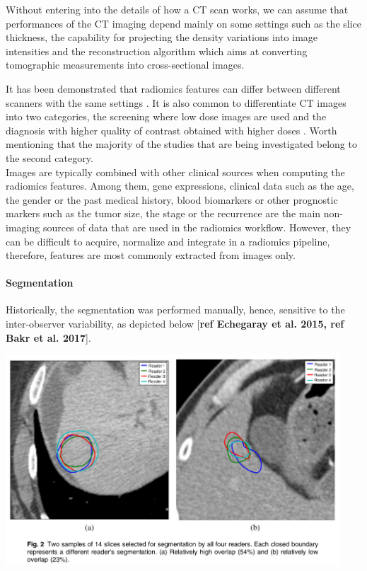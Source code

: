 \documentclass[]{article}
\let\oldparagraph\paragraph
\renewcommand{\paragraph}[1]{\oldparagraph{#1}\mbox{}}
\begin{document}
Without entering into the details of how a CT scan works, we can assume
that performances of the CT imaging depend mainly on some settings such
as the slice thickness, the capability for projecting the density
variations into image intensities and the reconstruction algorithm which
aims at converting tomographic measurements into cross-sectional images.

It has been demonstrated that radiomics features can differ between
different scanners with the same settings \cite{Berenguer2018}. It is also common to differentiate CT images into two
categories, the screening where low dose images are used and the
diagnosis with higher quality of contrast obtained with higher doses \cite{Thawani2018}. Worth mentioning that the
majority of the studies that are being investigated belong to the second
category.\\
Images are typically combined with other clinical sources when computing
the radiomics features. Among them, gene expressions, clinical data such
as the age, the gender or the past medical history, blood biomarkers or
other prognostic markers such as the tumor size, the stage or the
recurrence are the main non-imaging sources of data that are used in the
radiomics workflow. However, they can be difficult to acquire, normalize
and integrate in a radiomics pipeline, therefore, features are most
commonly extracted from images only.

\paragraph{Segmentation}\label{segmentation}

Historically, the segmentation was performed manually, hence, sensitive
to the inter-observer variability, as depicted below {[}\textbf{ref
Echegaray et al. 2015, ref Bakr et al. 2017}{]}.

\includegraphics[width=4.92776in,height=3.10385in]{./images/image11.png}
\end{document}
